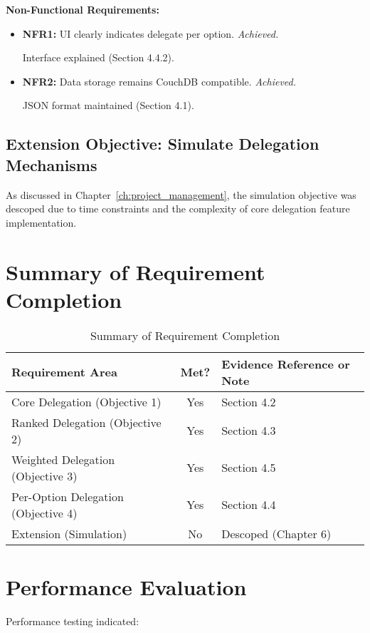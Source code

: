 \textbf{Non-Functional Requirements:}
\begin{itemize}
    \item \textbf{NFR1:} UI clearly indicates delegate per option. \textit{Achieved.} 
    
    Interface explained (Section 4.4.2).
    \item \textbf{NFR2:} Data storage remains CouchDB compatible. \textit{Achieved.}
    
    JSON format maintained (Section 4.1).
\end{itemize}

\subsection{Extension Objective: Simulate Delegation Mechanisms}

As discussed in Chapter~\ref{ch:project_management}, the simulation objective was descoped due to time constraints and the complexity of core delegation feature implementation.

\section{Summary of Requirement Completion}

\begin{table}[h]
\centering
\begin{tabular}{|l|c|l|}
\hline
\textbf{Requirement Area} & \textbf{Met?} & \textbf{Evidence Reference or Note} \\ \hline
Core Delegation (Objective 1) & Yes & Section 4.2 \\ \hline
Ranked Delegation (Objective 2) & Yes & Section 4.3 \\ \hline
Weighted Delegation (Objective 3) & Yes & Section 4.5 \\ \hline
Per-Option Delegation (Objective 4) & Yes & Section 4.4 \\ \hline
Extension (Simulation) & No & Descoped (Chapter 6) \\ \hline
\end{tabular}
\caption{Summary of Requirement Completion}
\end{table}

\section{Performance Evaluation}

Performance testing indicated:

